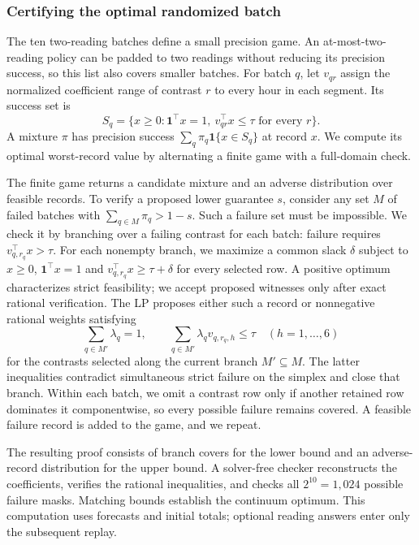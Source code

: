 \subsubsection{Certifying the optimal randomized batch}
\label{sec:complete-batch-precision}
The ten two-reading batches define a small precision game. An
at-most-two-reading policy can be padded to two readings without
reducing its precision success, so this list also covers smaller batches.
For batch $q$,
let $v_{qr}$ assign the normalized coefficient range of contrast $r$ to
every hour in each segment. Its success set is
\[
 S_q=\{x\geq0:\mathbf1^\top x=1,\ v_{qr}^\top x\leq\tau
       \text{ for every }r\}.
\]
A mixture $\pi$ has precision success
$\sum_q\pi_q\mathbf1\{x\in S_q\}$ at record $x$. We compute its optimal
worst-record value by alternating a finite game with a full-domain check.

The finite game returns a candidate mixture and an adverse distribution
over feasible records. To verify a proposed lower guarantee $s$, consider
any set $M$ of failed batches with $\sum_{q\in M}\pi_q>1-s$.
Such a failure set must be impossible. We check it by branching over a
failing contrast for each batch: failure requires
$v_{q,r_q}^\top x>\tau$. For each nonempty branch, we maximize a common
slack $\delta$ subject to $x\geq0$, $\mathbf1^\top x=1$ and
$v_{q,r_q}^\top x\geq\tau+\delta$ for every selected row.
A positive optimum characterizes strict feasibility; we accept proposed
witnesses only after exact rational verification. The LP proposes either
such a record or nonnegative rational weights satisfying
\[
 \sum_{q\in M'}\lambda_q=1,\qquad
 \sum_{q\in M'}\lambda_q v_{q,r_q,h}\leq\tau
 \quad(h=1,\ldots,6)
\]
for the contrasts selected along the current branch $M'\subseteq M$.
The latter inequalities contradict simultaneous strict failure on the
simplex and close that branch. Within each batch, we omit a contrast row
only if another retained row dominates it componentwise, so every possible
failure remains covered.
A feasible failure record is added to the game, and we repeat.

The resulting proof consists of branch covers for the lower bound and an
adverse-record distribution for the upper bound. A solver-free checker
reconstructs the coefficients, verifies the rational inequalities, and
checks all $2^{10}=1{,}024$ possible failure masks. Matching bounds establish
the continuum optimum. This computation uses forecasts and initial totals;
optional reading answers enter only the subsequent replay.
